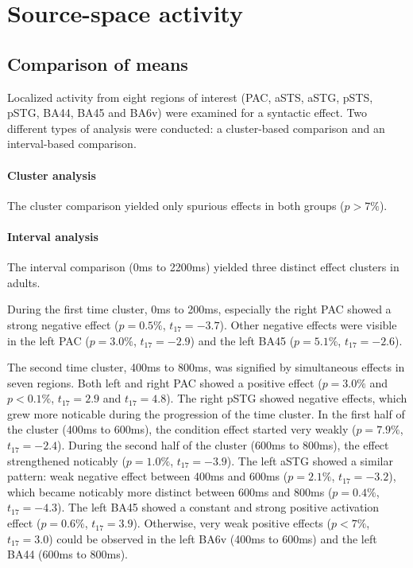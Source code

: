 \section{Source-space activity}

\subsection{Comparison of means}
Localized activity from eight regions of interest (PAC, aSTS, aSTG, pSTS, pSTG, BA44, BA45 and BA6v) were examined for a syntactic effect.
Two different types of analysis were conducted: a cluster-based comparison and an interval-based comparison.

\paragraph{Cluster analysis}
The cluster comparison yielded only spurious effects in both groups ($p > 7\%$).

\paragraph{Interval analysis}
The interval comparison (0ms to 2200ms) yielded three distinct effect clusters in adults.

During the first time cluster, 0ms to 200ms, especially the right PAC showed a strong negative effect ($p = 0.5\%$, $t_{17} = -3.7$).
Other negative effects were visible in the left PAC ($p = 3.0\%$, $t_{17} = -2.9$) and the left BA45 ($p = 5.1\%$, $t_{17} = -2.6$).

The second time cluster, 400ms to 800ms, was signified by simultaneous effects in seven regions.
Both left and right PAC showed a positive effect ($p = 3.0\%$ and $p < 0.1\%$, $t_{17} = 2.9$ and $t_{17} = 4.8$).
The right pSTG showed negative effects, which grew more noticable during the progression of the time cluster.
In the first half of the cluster (400ms to 600ms), the condition effect started very weakly ($p = 7.9\%$, $t_{17} = -2.4$).
During the second half of the cluster (600ms to 800ms), the effect strengthened noticably ($p = 1.0\%$, $t_{17} = -3.9$).
The left aSTG showed a similar pattern: weak negative effect between 400ms and 600ms ($p = 2.1\%$, $t_{17} = -3.2$), which became noticably more distinct between 600ms and 800ms ($p = 0.4\%$, $t_{17} = -4.3$).
The left BA45 showed a constant and strong positive activation effect ($p = 0.6\%$, $t_{17} = 3.9$).
Otherwise, very weak positive effects ($p < 7\%$, $t_{17} = 3.0$) could be observed in the left BA6v (400ms to 600ms) and the left BA44 (600ms to 800ms).

